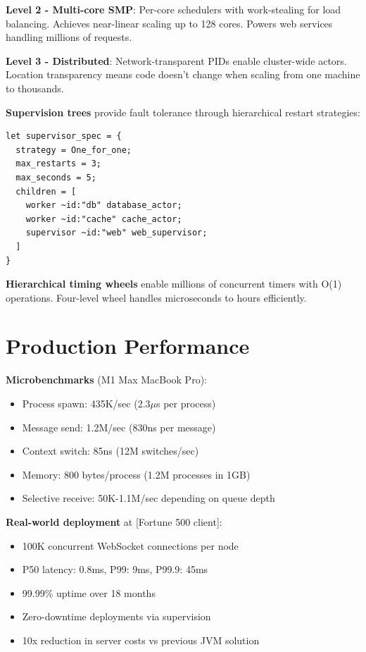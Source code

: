 \documentclass[sigplan,10pt]{acmart}
\begin{document}
\textbf{Level 2 - Multi-core SMP}: Per-core schedulers with work-stealing for load balancing. Achieves near-linear scaling up to 128 cores. Powers web services handling millions of requests.

\textbf{Level 3 - Distributed}: Network-transparent PIDs enable cluster-wide actors. Location transparency means code doesn't change when scaling from one machine to thousands.

\textbf{Supervision trees} provide fault tolerance through hierarchical restart strategies:
\begin{lstlisting}
let supervisor_spec = {
  strategy = One_for_one;
  max_restarts = 3;
  max_seconds = 5;
  children = [
    worker ~id:"db" database_actor;
    worker ~id:"cache" cache_actor;
    supervisor ~id:"web" web_supervisor;
  ]
}
\end{lstlisting}

\textbf{Hierarchical timing wheels} enable millions of concurrent timers with O(1) operations. Four-level wheel handles microseconds to hours efficiently.

\vspace{-0.2cm}
\section{Production Performance}

\textbf{Microbenchmarks} (M1 Max MacBook Pro):
\begin{itemize}
\itemsep0em
\item Process spawn: 435K/sec (2.3$\mu$s per process)
\item Message send: 1.2M/sec (830ns per message)
\item Context switch: 85ns (12M switches/sec)
\item Memory: 800 bytes/process (1.2M processes in 1GB)
\item Selective receive: 50K-1.1M/sec depending on queue depth
\end{itemize}

\textbf{Real-world deployment} at [Fortune 500 client]:
\begin{itemize}
\itemsep0em
\item 100K concurrent WebSocket connections per node
\item P50 latency: 0.8ms, P99: 9ms, P99.9: 45ms
\item 99.99\% uptime over 18 months
\item Zero-downtime deployments via supervision
\item 10x reduction in server costs vs previous JVM solution
\end{itemize}
\end{document}
